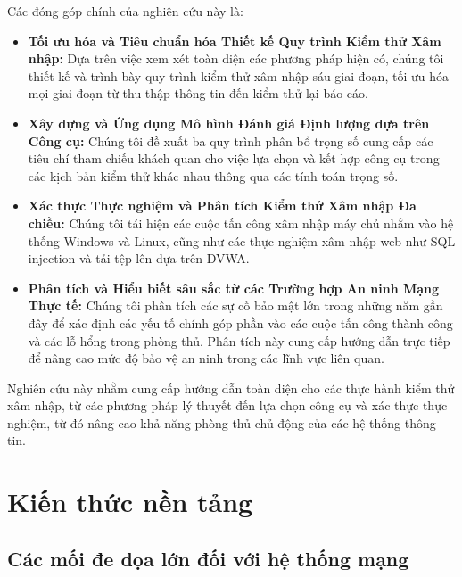 \documentclass[conference]{IEEEtran}
\begin{document}
Các đóng góp chính của nghiên cứu này là:
\begin{itemize}
\item \textbf{Tối ưu hóa và Tiêu chuẩn hóa Thiết kế Quy trình Kiểm thử Xâm nhập:} Dựa trên việc xem xét toàn diện các phương pháp hiện có, chúng tôi thiết kế và trình bày quy trình kiểm thử xâm nhập sáu giai đoạn, tối ưu hóa mọi giai đoạn từ thu thập thông tin đến kiểm thử lại báo cáo.
\item \textbf{Xây dựng và Ứng dụng Mô hình Đánh giá Định lượng dựa trên Công cụ:} Chúng tôi đề xuất ba quy trình phân bổ trọng số cung cấp các tiêu chí tham chiếu khách quan cho việc lựa chọn và kết hợp công cụ trong các kịch bản kiểm thử khác nhau thông qua các tính toán trọng số.
\item \textbf{Xác thực Thực nghiệm và Phân tích Kiểm thử Xâm nhập Đa chiều:} Chúng tôi tái hiện các cuộc tấn công xâm nhập máy chủ nhắm vào hệ thống Windows và Linux, cũng như các thực nghiệm xâm nhập web như SQL injection và tải tệp lên dựa trên DVWA.
\item \textbf{Phân tích và Hiểu biết sâu sắc từ các Trường hợp An ninh Mạng Thực tế:} Chúng tôi phân tích các sự cố bảo mật lớn trong những năm gần đây để xác định các yếu tố chính góp phần vào các cuộc tấn công thành công và các lỗ hổng trong phòng thủ. Phân tích này cung cấp hướng dẫn trực tiếp để nâng cao mức độ bảo vệ an ninh trong các lĩnh vực liên quan.
\end{itemize}

Nghiên cứu này nhằm cung cấp hướng dẫn toàn diện cho các thực hành kiểm thử xâm nhập, từ các phương pháp lý thuyết đến lựa chọn công cụ và xác thực thực nghiệm, từ đó nâng cao khả năng phòng thủ chủ động của các hệ thống thông tin.

\section{Kiến thức nền tảng}
\subsection{Các mối đe dọa lớn đối với hệ thống mạng}
\end{document}
